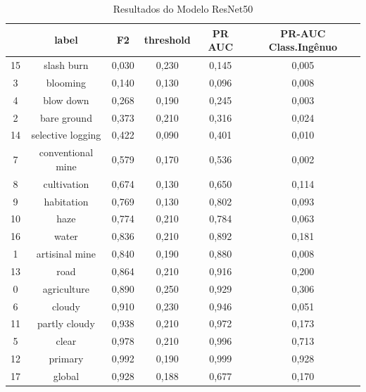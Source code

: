 \begin{table}[h!]
    \caption{Resultados do Modelo ResNet50}
    \centering
\begin{tabular}{*{6}{c}}
    \toprule
    {} &              label &  F2    &  threshold &  PR AUC &  PR-AUC Class.Ingênuo \\
    \midrule
    15 &         slash burn &  0,030 &      0,230 &   0,145 &       0,005 \\
    3  &           blooming &  0,140 &      0,130 &   0,096 &       0,008 \\
    4  &          blow down &  0,268 &      0,190 &   0,245 &       0,003 \\
    2  &        bare ground &  0,373 &      0,210 &   0,316 &       0,024 \\
    14 &  selective logging &  0,422 &      0,090 &   0,401 &       0,010 \\
    7  &  conventional mine &  0,579 &      0,170 &   0,536 &       0,002 \\
    8  &        cultivation &  0,674 &      0,130 &   0,650 &       0,114 \\
    9  &         habitation &  0,769 &      0,130 &   0,802 &       0,093 \\
    10 &               haze &  0,774 &      0,210 &   0,784 &       0,063 \\
    16 &              water &  0,836 &      0,210 &   0,892 &       0,181 \\
    1  &     artisinal mine &  0,840 &      0,190 &   0,880 &       0,008 \\
    13 &               road &  0,864 &      0,210 &   0,916 &       0,200 \\
    0  &        agriculture &  0,890 &      0,250 &   0,929 &       0,306 \\
    6  &             cloudy &  0,910 &      0,230 &   0,946 &       0,051 \\
    11 &      partly cloudy &  0,938 &      0,210 &   0,972 &       0,173 \\
    5  &              clear &  0,978 &      0,210 &   0,996 &       0,713 \\
    12 &            primary &  0,992 &      0,190 &   0,999 &       0,928 \\
    17 &             global &  0,928 &      0,188 &   0,677 &       0,170 \\
    \bottomrule
\end{tabular}
\label{table:AnexosResultadosResnet50}
\end{table}    
